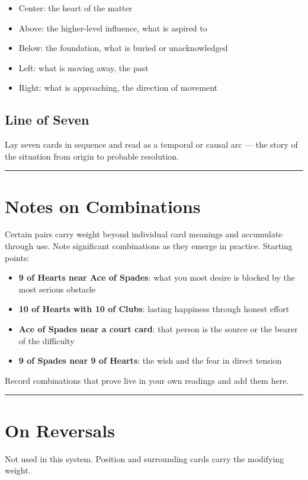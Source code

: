 \begin{itemize}
\tightlist
\item
  Center: the heart of the matter
\item
  Above: the higher-level influence, what is aspired to
\item
  Below: the foundation, what is buried or unacknowledged
\item
  Left: what is moving away, the past
\item
  Right: what is approaching, the direction of movement
\end{itemize}

\subsection{Line of Seven}\label{line-of-seven}

Lay seven cards in sequence and read as a temporal or causal arc --- the story of the situation from origin to probable resolution.

\begin{center}\rule{0.5\linewidth}{0.5pt}\end{center}

\section{Notes on Combinations}\label{notes-on-combinations}

Certain pairs carry weight beyond individual card meanings and accumulate through use. Note significant combinations as they emerge in practice. Starting points:

\begin{itemize}
\tightlist
\item
  \textbf{9 of Hearts near Ace of Spades}: what you most desire is blocked by the most serious obstacle
\item
  \textbf{10 of Hearts with 10 of Clubs}: lasting happiness through honest effort
\item
  \textbf{Ace of Spades near a court card}: that person is the source or the bearer of the difficulty
\item
  \textbf{9 of Spades near 9 of Hearts}: the wish and the fear in direct tension
\end{itemize}

Record combinations that prove live in your own readings and add them here.

\begin{center}\rule{0.5\linewidth}{0.5pt}\end{center}

\section{On Reversals}\label{on-reversals}

Not used in this system. Position and surrounding cards carry the modifying weight.
